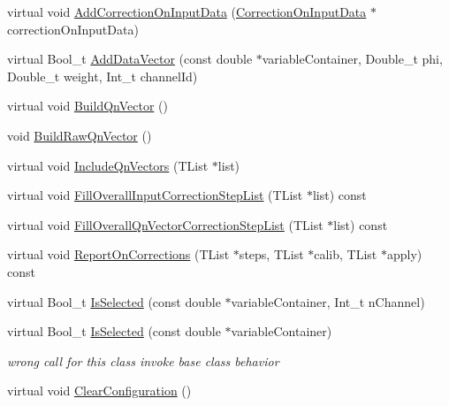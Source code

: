 \begin{DoxyCompactItemize}
virtual void \mbox{\hyperlink{classQn_1_1DetectorConfigurationChannels_ab5c641503809ce981651bb08ffc50f0e}{Add\+Correction\+On\+Input\+Data}} (\mbox{\hyperlink{classQn_1_1CorrectionOnInputData}{Correction\+On\+Input\+Data}} $\ast$correction\+On\+Input\+Data)
\item 
virtual Bool\+\_\+t \mbox{\hyperlink{classQn_1_1DetectorConfigurationChannels_a1f22484e703888f5ff9548d9a8421d3b}{Add\+Data\+Vector}} (const double $\ast$variable\+Container, Double\+\_\+t phi, Double\+\_\+t weight, Int\+\_\+t channel\+Id)
\item 
virtual void \mbox{\hyperlink{classQn_1_1DetectorConfigurationChannels_aa68804ba67cf6fdee8891e6aed0e14f7}{Build\+Qn\+Vector}} ()
\item 
void \mbox{\hyperlink{classQn_1_1DetectorConfigurationChannels_a6770ab3360c5e688c30bbea0522f3856}{Build\+Raw\+Qn\+Vector}} ()
\item 
virtual void \mbox{\hyperlink{classQn_1_1DetectorConfigurationChannels_a6756b2b2bed25bee5659953ae82ce5b7}{Include\+Qn\+Vectors}} (T\+List $\ast$list)
\item 
virtual void \mbox{\hyperlink{classQn_1_1DetectorConfigurationChannels_aa9e99a908719d0de616cebf9329fe83f}{Fill\+Overall\+Input\+Correction\+Step\+List}} (T\+List $\ast$list) const
\item 
virtual void \mbox{\hyperlink{classQn_1_1DetectorConfigurationChannels_a002931544421b46c9402aa7bdefcff51}{Fill\+Overall\+Qn\+Vector\+Correction\+Step\+List}} (T\+List $\ast$list) const
\item 
virtual void \mbox{\hyperlink{classQn_1_1DetectorConfigurationChannels_a753f23bd918444d853d1deebeefa4727}{Report\+On\+Corrections}} (T\+List $\ast$steps, T\+List $\ast$calib, T\+List $\ast$apply) const
\item 
virtual Bool\+\_\+t \mbox{\hyperlink{classQn_1_1DetectorConfigurationChannels_a45d03a27b4825709c2440a905ca8959a}{Is\+Selected}} (const double $\ast$variable\+Container, Int\+\_\+t n\+Channel)
\item 
\mbox{\label{classQn_1_1DetectorConfigurationChannels_afa63699a8f8dad1d2506b607f1ed8e83}} 
virtual Bool\+\_\+t \mbox{\hyperlink{classQn_1_1DetectorConfigurationChannels_afa63699a8f8dad1d2506b607f1ed8e83}{Is\+Selected}} (const double $\ast$variable\+Container)
\begin{DoxyCompactList}\small\item\em wrong call for this class invoke base class behavior \end{DoxyCompactList}\item 
virtual void \mbox{\hyperlink{classQn_1_1DetectorConfigurationChannels_a692b4880a3a694cf9a3ad860cb3f7b52}{Clear\+Configuration}} ()
\end{DoxyCompactItemize}
